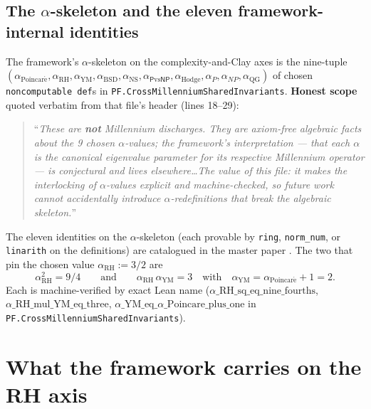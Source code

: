 \documentclass[11pt,a4paper]{article}
\theoremstyle{plain}
\theoremstyle{definition}
\begin{document}
\subsection{The $\alpha$-skeleton and the eleven framework-internal
identities}
\label{sec:alpha-skeleton}

The framework's $\alpha$-skeleton on the complexity-and-Clay axes is
the nine-tuple
$(\alpha_{\mathrm{Poincar\acute e}}, \alpha_{\mathrm{RH}},
\alpha_{\mathrm{YM}}, \alpha_{\mathrm{BSD}}, \alpha_{\mathrm{NS}},
\alpha_{\mathsf{P}\mathrm{vs}\mathsf{NP}}, \alpha_{\mathrm{Hodge}},
\alpha_{P}, \alpha_{NP}, \alpha_{\mathrm{QG}})$ of chosen
\texttt{noncomputable def}s in
\texttt{PF.CrossMillenniumSharedInvariants}. \textbf{Honest scope}
quoted verbatim from that file's header (lines 18--29):
\begin{quote}
``\emph{These are \textbf{not} Millennium discharges. They are
axiom-free algebraic facts about the 9 chosen $\alpha$-values; the
framework's interpretation --- that each $\alpha$ is the canonical
eigenvalue parameter for its respective Millennium operator --- is
conjectural and lives elsewhere\ldots The value of this file: it
makes the \emph{interlocking} of $\alpha$-values explicit and
machine-checked, so future work cannot accidentally introduce
$\alpha$-redefinitions that break the algebraic skeleton.}''
\end{quote}

The eleven identities on the $\alpha$-skeleton (each provable by
\texttt{ring}, \texttt{norm\_num}, or \texttt{linarith} on the
definitions) are catalogued in the master paper
\cite[Thm~2.3]{master_substrate}. The two that pin the chosen value
$\alpha_{\mathrm{RH}} := 3/2$ are
\[
\alpha_{\mathrm{RH}}^{2} = 9/4
\qquad\text{and}\qquad
\alpha_{\mathrm{RH}}\,\alpha_{\mathrm{YM}} = 3
\quad\text{with}\quad
\alpha_{\mathrm{YM}} = \alpha_{\mathrm{Poincar\acute e}} + 1 = 2.
\]
Each is machine-verified by exact Lean name
($\alpha\_\mathrm{RH}\_\mathrm{sq}\_\mathrm{eq}\_\mathrm{nine}\_\mathrm{fourths}$,
$\alpha\_\mathrm{RH}\_\mathrm{mul}\_\mathrm{YM}\_\mathrm{eq}\_\mathrm{three}$,
$\alpha\_\mathrm{YM}\_\mathrm{eq}\_\alpha\_\mathrm{Poincare}\_\mathrm{plus}\_\mathrm{one}$
in \texttt{PF.CrossMillenniumSharedInvariants}).

\section{What the framework carries on the RH axis}
\label{sec:rh-on-substrate}
\end{document}
